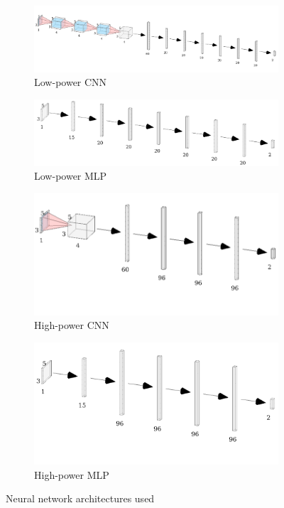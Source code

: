 \begin{figure}\centering
    \begin{subfigure}{.98\linewidth}
     \includegraphics[width=0.98\linewidth]{lp_cnn_arch_crop.png}
        \caption{Low-power CNN}
    \end{subfigure}
    \begin{subfigure}{.74\linewidth}
     \includegraphics[width=0.98\linewidth]{lp_mlp_arch_crop.png}
        \caption{Low-power MLP}
    \end{subfigure}
    \begin{subfigure}{.49\linewidth}
     \includegraphics[width=0.98\linewidth]{hp_cnn_arch_crop.png}
        \caption{High-power CNN}
    \end{subfigure}
    \begin{subfigure}{.49\linewidth}
     \includegraphics[width=0.98\linewidth]{hp_mlp_arch_crop.png}
        \caption{High-power MLP}
    \end{subfigure}
\caption{Neural network architectures used}
\label{fig:all_archs}
\end{figure}

